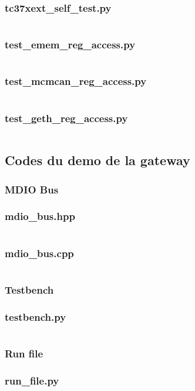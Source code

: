 \subsubsection*{tc37xext\_self\_test.py}
\label{anexe:tc37ex:tests:self}
\inputminted[autogobble]{python}{anexes/tc37ex/tests/tc37xext_self_test.py}

\subsubsection*{test\_emem\_reg\_access.py}
\label{anexe:tc37ex:tests:emem_reg_access}
\inputminted[autogobble]{c}{anexes/tc37ex/tests/test_emem_reg_access_ext.c}

\subsubsection*{test\_mcmcan\_reg\_access.py}
\label{anexe:tc37ex:tests:mcmcan_reg_access}
\inputminted[autogobble]{c}{anexes/tc37ex/tests/test_mcmcan_reg_access_ext.c}

\subsubsection*{test\_geth\_reg\_access.py}
\label{anexe:tc37ex:tests:geth_reg_access}
\inputminted[autogobble]{c}{anexes/tc37ex/tests/test_geth_reg_access_ext.c}


\subsection{Codes du demo de la gateway}

\subsubsection{MDIO Bus}
\label{anexe:gw_demo:mdio_bus}
\subsubsection*{mdio\_bus.hpp}
\inputminted[autogobble]{c++}{anexes/Gw_demo/mdio_bus.hpp}
\subsubsection*{mdio\_bus.cpp}
\inputminted[autogobble]{c++}{anexes/Gw_demo/mdio_bus.cpp}

\subsubsection{Testbench}
\label{anexe:gw_demo:testbench}
\subsubsection*{testbench.py}
\inputminted[autogobble]{python}{anexes/Gw_demo/testbench.py}

\subsubsection{Run file}
\label{anexe:gw_demo:run_file}
\subsubsection*{run\_file.py}
\inputminted[autogobble]{python}{anexes/Gw_demo/run_microsar.py}
